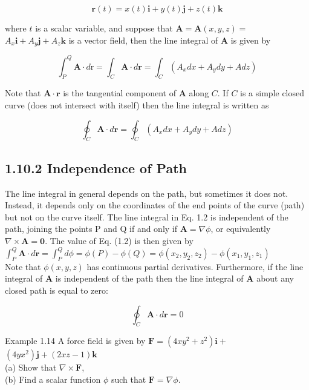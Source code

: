 \documentclass[10pt]{article}
\begin{document}
$$
\mathbf{r}(t)=x(t) \mathbf{i}+y(t) \mathbf{j}+z(t) \mathbf{k}
$$

where $t$ is a scalar variable, and suppose that $\mathbf{A}=\mathbf{A}(x, y, z)=$ $A_{x} \mathbf{i}+A_{y} \mathbf{j}+A_{z} \mathbf{k}$ is a vector field, then the line integral of $\mathbf{A}$ is given by


\begin{equation*}
\int_{P}^{Q} \mathbf{A} \cdot d \mathrm{r}=\int_{C} \mathbf{A} \cdot d \mathbf{r}=\int_{C}\left(A_{x} d x+A_{y} d y+A d z\right) \tag{1.2}
\end{equation*}


Note that $\mathbf{A} \cdot \mathbf{r}$ is the tangential component of $\mathbf{A}$ along $C$. If $C$ is a simple closed curve (does not intersect with itself) then the line integral is written as

$$
\oint_{C} \mathbf{A} \cdot d \mathbf{r}=\oint_{C}\left(A_{x} d x+A_{y} d y+A d z\right)
$$

\subsection*{1.10.2 Independence of Path}
The line integral in general depends on the path, but sometimes it does not. Instead, it depends only on the coordinates of the end points of the curve (path) but not on the curve itself. The line integral in Eq. 1.2 is independent of the path, joining the points P and Q if and only if $\mathbf{A}=\nabla \phi$, or equivalently $\nabla \times \mathbf{A}=\mathbf{0}$. The value of Eq. (1.2) is then given by\\
$\int_{P}^{Q} \mathbf{A} \cdot d \mathbf{r}=\int_{P}^{Q} d \phi=\phi(P)-\phi(Q)=\phi\left(x_{2}, y_{2}, z_{2}\right)-\phi\left(x_{1}, y_{1}, z_{1}\right)$\\
Note that $\phi(x, y, z)$ has continuous partial derivatives. Furthermore, if the line integral of $\mathbf{A}$ is independent of the path then the line integral of $\mathbf{A}$ about any closed path is equal to zero:

$$
\oint_{C} \mathbf{A} \cdot d \mathbf{r}=0
$$

Example 1.14 A force field is given by $\mathbf{F}=\left(4 x y^{2}+z^{2}\right) \mathbf{i}+$ $\left(4 y x^{2}\right) \mathbf{j}+(2 x z-1) \mathbf{k}$\\
(a) Show that $\nabla \times \mathbf{F}$,\\
(b) Find a scalar function $\phi$ such that $\mathbf{F}=\nabla \phi$.
\end{document}
